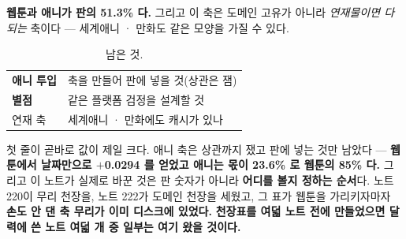 \documentclass[10pt]{article}
\begin{document}
{\textbf{웹툰과 애니가 판의 51.3\% 다.} 그리고 이 축은 도메인 고유가
아니라 \emph{연재물이면 다 되는} 축이다 --- 세계애니 · 만화도 같은 모양을
가질 수 있다.}

\begin{table}[t]
\centering\tsize
\caption{남은 것.}
\begin{tabular}{ll}
\toprule
\textbf{애니 투입} & 축을 만들어 판에 넣을 것(상관은 잼) \\
\textbf{별점} & 같은 플랫폼 검정을 설계할 것 \\
연재 축 & 세계애니 · 만화에도 캐시가 있나 \\
\bottomrule
\end{tabular}
\end{table}

첫 줄이 곧바로 값이 제일 크다. 애니 축은 상관까지 쟀고 판에 넣는 것만
남았다 --- \textbf{웹툰에서 날짜만으로 $+$0.0294 를 얻었고 애니는 몫이
23.6\% 로 웹툰의 85\% 다.} 그리고 이 노트가 실제로 바꾼 것은 판 숫자가
아니라 \textbf{어디를 볼지 정하는 순서}다. 노트 220이 무리 천장을,
노트 222가 도메인 천장을 세웠고, 그 표가 웹툰을 가리키자마자 \textbf{손도
안 댄 축 무리가 이미 디스크에 있었다.} \textbf{천장표를 여덟 노트 전에
만들었으면 달력에 쓴 노트 여덟 개 중 일부는 여기 왔을 것이다.}
\end{document}
